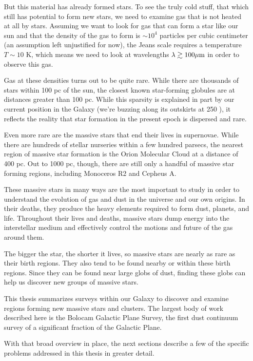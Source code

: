 But this material has already formed stars.  To see the truly cold stuff, that
which still has potential to form new stars, we need to examine gas that is not
heated at all by stars.  Assuming we want to look for gas that can form a star
like our sun and that the density of the gas to form is $\sim10^4$ particles
per cubic centimeter (an assumption left unjustified for now), the Jeans scale
requires a temperature $T\sim10$ K, which means we need to look at wavelengths
$\lambda \gtrsim 100 \mu \textrm{m}$ in order to observe this gas.

Gas at these densities turns out to be quite rare.  While there are thousands
of stars within 100 pc of the sun, the closest known star-forming globules are
at distances greater than 100 pc.  While this sparsity is explained in part by
our current position in the Galaxy (we're buzzing along its outskirts at 250
\kms), it reflects the reality that star formation in the present epoch is
dispersed and rare.

Even more rare are the massive stars that end their lives in supernovae.  While there
are hundreds of stellar nurseries within a few hundred parsecs, the nearest
region of massive star formation is the Orion Molecular Cloud at a distance of
400 pc.  Out to 1000 pc, though, there are still only a handful of massive star
forming regions, including Monoceros R2 and Cepheus A.

These massive stars in many ways are the most important to study in order to
understand the evolution of gas and dust in the universe and our own origins.
In their deaths, they produce the heavy elements required to form dust,
planets, and life.  Throughout their lives and deaths, massive stars dump
energy into the interstellar medium and effectively control the motions and
future of the gas around them.

The bigger the star, the shorter it lives, so massive stars are nearly as rare
as their birth regions.  They also tend to be found nearby or within these
birth regions.  Since they can be found near large globs of dust, finding these
globs can help us discover new groups of massive stars.

This thesis summarizes surveys within our Galaxy to discover and examine
regions forming new massive stars and clusters.  The largest body of work
described here is the Bolocam Galactic Plane Survey, the first dust continuum
survey of a significant fraction of the Galactic Plane.

With that broad overview in place, the next sections describe a few of the
specific problems addressed in this thesis in greater detail.

